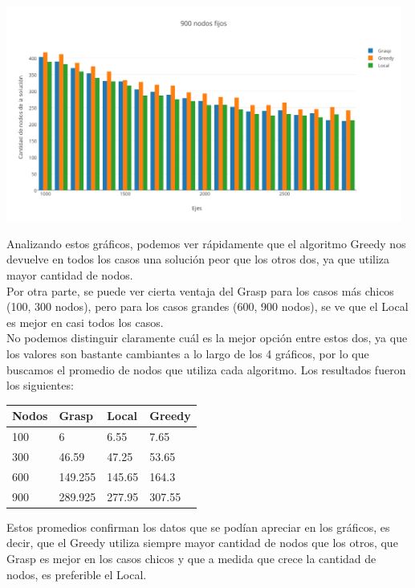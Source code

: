 \begin{center}
 	\includegraphics[width=13cm, keepaspectratio=yes]{imagenes/6/900NodosFijos.png}
\end{center}
 
Analizando estos gr\'aficos, podemos ver r\'apidamente que el algoritmo Greedy nos devuelve en todos los casos una soluci\'on peor que los otros dos, ya que utiliza mayor cantidad de nodos.\\
Por otra parte, se puede ver cierta ventaja del Grasp para los casos m\'as chicos (100, 300 nodos), pero para los casos grandes (600, 900 nodos), se ve que el Local es mejor en casi todos los casos.\\

No podemos distinguir claramente cu\'al es la mejor opci\'on entre estos dos, ya que los valores son bastante cambiantes a lo largo de los 4 gr\'aficos, por lo que buscamos el promedio de nodos que utiliza
cada algoritmo. Los resultados fueron los siguientes:\\

\begin{tabular}{| l | l | l | l |}
   \hline
   Nodos & Grasp & Local & Greedy\\ \hline
   100 & 6 & 6.55 & 7.65 \\ \hline
   300 & 46.59 & 47.25 & 53.65 \\ \hline
   600 & 149.255 & 145.65 & 164.3 \\ \hline
   900 & 289.925 & 277.95 & 307.55 \\
   \hline
\end{tabular}

Estos promedios confirman los datos que se pod\'ian apreciar en los gr\'aficos, es decir, que el Greedy utiliza siempre mayor cantidad de nodos que los otros, que Grasp es mejor en los casos chicos y
que a medida que crece la cantidad de nodos, es preferible el Local.\\

